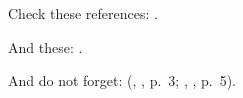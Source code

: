 \documentclass{article}
\begin{document}
Check these references: \citep{adams03,collier09}.

And these: \citep[p.~3]{adams03}.

And do not forget: (\citeauthor{adams03}, \citeyear{adams03}, p.~3; \citeauthor{collier09}, \citeyear{collier09}, p.~5).



\end{document}
